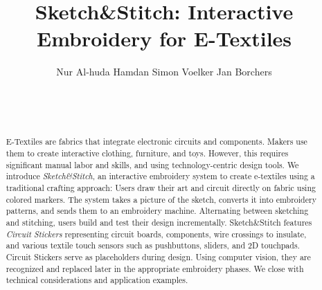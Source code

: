 \documentclass{sigchi}
\def\plaintitle{Sketch\&Stitch: Interactive Embroidery for E-Textiles}
\begin{document}
\title{\plaintitle}

\author{
  Nur Al-huda Hamdan \hspace*{0.9cm} Simon Voelker \hspace*{0.9cm} Jan Borchers\\
  \\
    \\
    \\
}





\maketitle



\begin{abstract}
E-Textiles are fabrics that integrate electronic circuits and components. Makers use them to create interactive clothing, furniture, and toys. However, this requires significant manual labor and skills, and using technology-centric design tools. We introduce \textit{Sketch\&Stitch}, an interactive embroidery system to create e-textiles using a traditional crafting approach: Users draw their art and circuit directly on fabric using colored markers. The system takes a picture of the sketch, converts it into embroidery patterns, and sends them to an embroidery machine. Alternating between sketching and stitching, users build and test their design incrementally. Sketch\&Stitch features \textit{Circuit Stickers} representing circuit boards, components, wire crossings to insulate, and various textile touch sensors such as pushbuttons, sliders, and 2D touchpads. Circuit Stickers serve as placeholders during design. Using computer vision, they are recognized and replaced later in the appropriate embroidery phases. We close with technical considerations and application examples.
\end{abstract}
\end{document}

